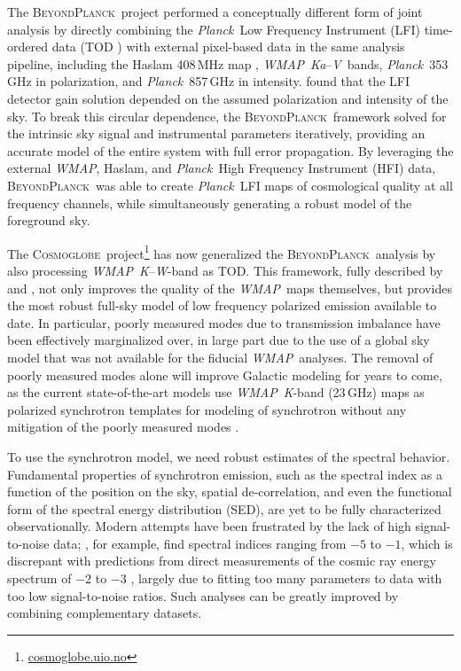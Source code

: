 \documentclass[twocolumn]{../../common/aa}
\def\WMAP{\emph{WMAP}}
\def\Planck{\emph{Planck}}
\newcommand{\bp}{\textsc{BeyondPlanck}}
\newcommand{\cosmoglobe}{\textsc{Cosmoglobe}}
\newcommand{\K}[0]{\textit K}
\newcommand{\Ka}[0]{\textit{Ka}}
\newcommand{\V}[0]{\textit V}
\newcommand{\W}[0]{\textit W}
\begin{document}
The \bp\ project performed a conceptually different form of joint analysis by directly combining the \Planck\ Low Frequency Instrument (LFI) time-ordered data (TOD \citealt{bp01}) with external pixel-based data in the same analysis pipeline, including the Haslam 408\,MHz map \citep{haslam1982}, \WMAP\ \Ka--\V\ bands, \Planck\ 353\,GHz in polarization, and \Planck\ 857\,GHz in intensity. \citet{planck2016-l02} found that the LFI detector gain solution depended on the assumed polarization and intensity of the sky. To break this circular dependence, the \bp\ framework solved for the intrinsic sky signal and instrumental parameters iteratively, providing an accurate model of the entire system with full error propagation. By leveraging the external \WMAP, Haslam, and \Planck\ High Frequency Instrument (HFI)  data, \bp\ was able to create \Planck\ LFI maps of cosmological quality at all frequency channels, while simultaneously generating a robust model of the foreground sky.

The \cosmoglobe\ project\footnote{\url{cosmoglobe.uio.no}} has now generalized the \bp\ analysis by also processing  \WMAP\ \K--\W-band as TOD. This framework, fully described by \citet{bp17} and \cite{watts2023_dr1},
not only improves the quality of the \WMAP\ maps themselves, but provides the most robust full-sky model of low frequency polarized emission available to date. In particular, poorly measured modes due to transmission imbalance \citep{jarosik2007} have been effectively marginalized over, in large part due to the use of a global sky model that was not available for the fiducial \WMAP\ analyses. The removal of poorly measured modes alone will improve Galactic modeling for years to come, as the current state-of-the-art models use \WMAP\ \K-band (23\,GHz) maps as polarized synchrotron templates for modeling of synchrotron without any mitigation of the poorly measured modes \citep{delabrouille2012,pysm2,pysm3}.

To use the synchrotron model, we need robust estimates of the spectral behavior. Fundamental properties of synchrotron emission, such as the spectral index as a function of the position on the sky, spatial de-correlation, and even the functional form of the spectral energy distribution (SED), are yet to be fully characterized observationally. Modern attempts have been frustrated by the lack of high signal-to-noise data; \citet{deBelsunce:2022}, for example, find spectral indices ranging from $-5$ to $-1$, which is discrepant with predictions from direct measurements of the cosmic ray energy spectrum of $-2$ to $-3$ \citep{rybicki,orlando2013,neronov2017}, largely due to fitting too many parameters to data with too low signal-to-noise ratios. Such analyses can be greatly improved by combining complementary datasets.
\end{document}
